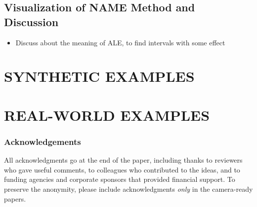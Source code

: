 \documentclass[twoside]{article}
\begin{document}


\subsection{Visualization of NAME Method and Discussion}
\label{sec:visualization}

\begin{itemize}
\item Discuss about the meaning of ALE, to find intervals with some effect
\end{itemize}

\section{SYNTHETIC EXAMPLES}

\section{REAL-WORLD EXAMPLES}


\subsubsection*{Acknowledgements}
All acknowledgments go at the end of the paper, including thanks to reviewers who gave useful comments, to colleagues who contributed to the ideas, and to funding agencies and corporate sponsors that provided financial support. 
To preserve the anonymity, please include acknowledgments \emph{only} in the camera-ready papers.


\end{document}
